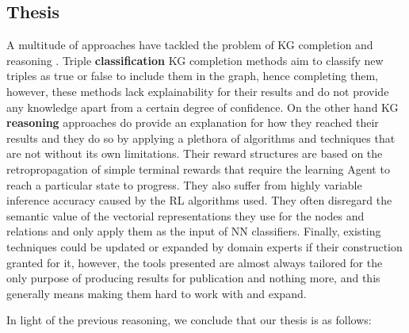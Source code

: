 \subsection{Thesis}


A multitude of approaches have tackled the problem of KG completion \cite{} and reasoning \cite{}. Triple \textbf{classification} KG completion methods aim to classify new triples as true or false to include them in the graph, hence completing them, however, these methods lack explainability for their results and do not provide any knowledge apart from a certain degree of confidence.
On the other hand KG \textbf{reasoning} approaches do provide an explanation for how they reached their results and they do so by applying a plethora of algorithms and techniques that are not without its own limitations. Their reward structures are based on the retropropagation of simple terminal rewards that require the learning Agent to reach a particular state to progress. They also suffer from highly variable inference accuracy caused by the RL algorithms used. They often disregard the semantic value of the vectorial representations they use for the nodes and relations and only apply them as the input of NN classifiers. Finally, existing techniques could be updated or expanded by domain experts if their construction granted for it, however, the tools presented are almost always tailored for the only purpose of producing results for publication and nothing more, and this generally means making them hard to work with and expand.

In light of the previous reasoning, we conclude that our thesis is as follows:



